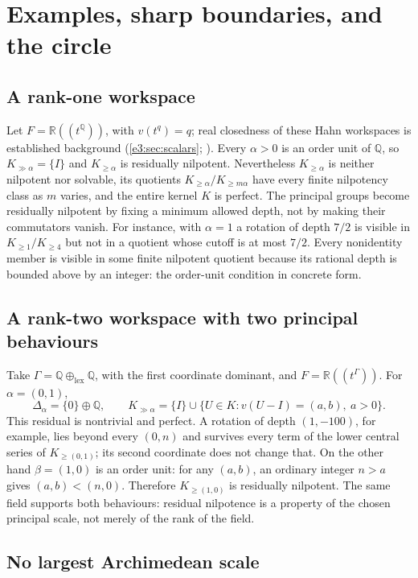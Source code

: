 \documentclass[11pt,letterpaper]{article}
\numberwithin{equation}{section}
\theoremstyle{definition}
\theoremstyle{remark}
\newcommand{\R}{\mathbb R}
\newcommand{\Q}{\mathbb Q}
\begin{document}
\section{Examples, sharp boundaries, and the circle}\label{e3:cut:sec:examples}

\subsection{A rank-one workspace}

Let $F=\R((t^{\Q}))$, with $v(t^q)=q$; real closedness of these Hahn
workspaces is established background (\cref{e3:sec:scalars};
\cite[Corollary~2.1]{BG}). Every $\alpha>0$ is an order unit of $\Q$, so
$K_{\gg\alpha}=\{I\}$ and $K_{\ge\alpha}$ is residually nilpotent. Nevertheless
$K_{\ge\alpha}$ is neither nilpotent nor solvable, its quotients
$K_{\ge\alpha}/K_{\ge m\alpha}$ have every finite nilpotency class as $m$ varies,
and the entire kernel $K$ is perfect. The principal groups become residually
nilpotent by fixing a minimum allowed depth, not by making their commutators
vanish. For instance, with $\alpha=1$ a rotation of depth $7/2$ is visible in
$K_{\ge1}/K_{\ge4}$ but not in a quotient whose cutoff is at most $7/2$. Every
nonidentity member is visible in some finite nilpotent quotient because its
rational depth is bounded above by an integer: the order-unit condition in
concrete form.

\subsection{A rank-two workspace with two principal behaviours}

Take $\Gamma=\Q\oplus_{\mathrm{lex}}\Q$, with the first coordinate dominant, and
$F=\R((t^\Gamma))$. For $\alpha=(0,1)$,
\[
 \Delta_\alpha=\{0\}\oplus\Q,\qquad
 K_{\gg\alpha}=\{I\}\cup\{U\in K:v(U-I)=(a,b),\ a>0\}.
\]
This residual is nontrivial and perfect. A rotation of depth $(1,-100)$, for
example, lies beyond every $(0,n)$ and survives every term of the lower central
series of $K_{\ge(0,1)}$; its second coordinate does not change that. On the
other hand $\beta=(1,0)$ is an order unit: for any $(a,b)$, an ordinary integer
$n>a$ gives $(a,b)<(n,0)$. Therefore $K_{\ge(1,0)}$ is residually nilpotent. The
same field supports both behaviours: residual nilpotence is a property of the
chosen principal scale, not merely of the rank of the field.

\subsection{No largest Archimedean scale}
\end{document}
